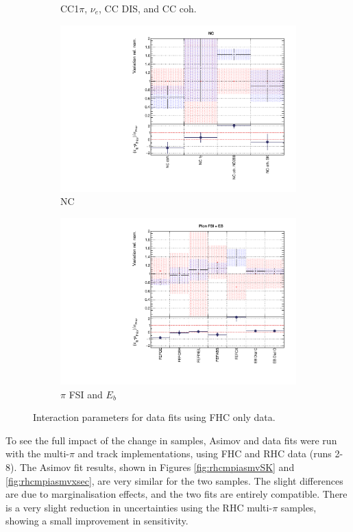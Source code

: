 \begin{figure}
\begin{subfigure}{0.49\textwidth}
  \caption{CC1$\pi$, $\nu_e$, CC DIS, and CC coh.}
\end{subfigure}
\begin{subfigure}{0.49\textwidth}
  \centering
  \includegraphics[width=0.95\linewidth]{figs/rhcmpdatxsec248_3}
  \caption{NC}
\end{subfigure}
\begin{subfigure}{0.49\textwidth}
  \centering
  \includegraphics[width=0.95\linewidth]{figs/rhcmpdatxsec248_4}
  \caption{$\pi$ FSI and $E_b$}
\end{subfigure}
\caption{Interaction parameters for data fits using FHC only data.}
\label{fig:rhcmpidat248xsec}
\end{figure}

To see the full impact of the change in samples, Asimov and data fits were run with the multi-$\pi$ and track implementations, using FHC and RHC data (runs 2-8). The Asimov fit results, shown in Figures \ref{fig:rhcmpiasmvSK} and \ref{fig:rhcmpiasmvxsec}, are very similar for the two samples. The slight differences are due to marginalisation effects, and the two fits are entirely compatible. There is a very slight reduction in uncertainties using the RHC multi-$\pi$ samples, showing a small improvement in sensitivity.

